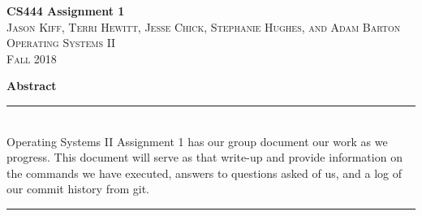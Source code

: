\documentclass[10pt,a4paper,english]{article}
\begin{document}

\begin{titlepage}
\vspace*{\fill}

\newcommand{\HRule}{\rule{\linewidth}{0.5mm}} %

\center %


{ \huge \bfseries CS444 Assignment 1}\\[0.4cm] %


\textsc{\LARGE Jason Kiff, Terri Hewitt, Jesse Chick, Stephanie Hughes, and Adam Barton}\\[0.5cm] %
\textsc{\Large Operating Systems II}\\[0.5cm] %
\textsc{\large Fall 2018}\\[2.5cm] %


\begin{minipage}{.6\textwidth}
\textbf{\large Abstract} \\
\HRule \\[0.4cm]
Operating Systems II Assignment 1 has our group document our work as we progress. This document will serve as that write-up and provide information on the commands we have executed, answers to questions asked of us, and a log of our commit history from git.
\\[0.4cm]
\HRule \\[1.5cm]
\end{minipage}



\end{titlepage}
\end{document}
